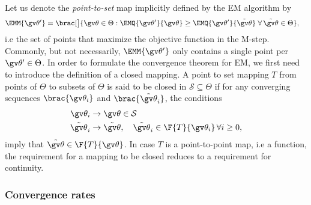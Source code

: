 Let us denote the \emph{point-to-set} map implicitly defined by the EM
algorithm by 
\begin{align}
	\EMM{\Th'}&=\brac[\big]{\Th\in\Theta : \EMQ{\Th'}{\Th} \geq \EMQ{\Th'}{\tilde\Th}\; \forall \,\tilde\Th\in\Theta },
\end{align}
i.e the set of points that maximize the objective function in the M-step. 
Commonly, but not necessarily, $\EMM{\Th'}$ only contains a single point per $\Th'\in\Theta$.
In order to formulate the convergence theorem for EM, we first need to introduce the definition
of a closed mapping. A point to set mapping $T$ from points of $\Theta$ to subsets of $\Theta$
is said to be closed in $\mathcal{S}\subseteq \Theta$ if for any converging sequences
$\brac{\Th_i}$ and $\brac{\tilde\Th_i}$, the conditions 
\begin{align}
\Th_i&\to\Th\in\mathcal{S}\\
\tilde\Th_i&\to\tilde\Th,\quad \tilde\Th_i\in\F{T}{\Th_i}\,\forall i \geq 0,
\end{align}
imply that $\tilde\Th\in\F{T}{\Th}$. In case $T$ is a point-to-point map, i.e a function,
the requirement for a mapping to be closed reduces to a requirement for continuity.

\subsubsection{Convergence rates}

